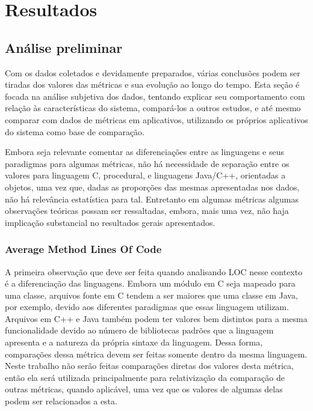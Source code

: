 \chapter{Resultados}
\label{cap:resultados}


\section{Análise preliminar}

Com os dados coletados e devidamente preparados, várias conclusões podem ser tiradas dos valores das métricas e sua evolução ao longo do tempo. Esta seção é focada na análise subjetiva dos dados, tentando explicar seu comportamento com relação às características do sistema, compará-los a outros estudos, e até mesmo comparar com dados de métricas em aplicativos, utilizando os próprios aplicativos do sistema como base de comparação.

Embora seja relevante comentar as diferenciações entre as linguagens e seus paradigmas para algumas métricas,  não há necessidade de separação entre os valores para linguagem C, procedural, e linguagens Java/C++, orientadas a objetos, uma vez que, dadas as proporções das mesmas apresentadas nos dados, não há relevância estatística para tal. Entretanto em algumas métricas algumas observações teóricas possam ser ressaltadas, embora, mais uma vez, não haja implicação substancial no resultados gerais apresentados.

\subsection{Average Method Lines Of Code}
A primeira observação que deve ser feita quando analisando LOC nesse contexto é a diferenciação das linguagens. Embora um módulo em C seja mapeado para uma classe, arquivos fonte em C tendem a ser maiores que uma classe em Java, por exemplo, devido aos diferentes paradigmas que essas linguagem utilizam. Arquivos em C++ e Java também podem ter valores bem distintos para a mesma funcionalidade devido ao número de bibliotecas padrões que a linguagem apresenta e a natureza da própria sintaxe da linguagem. Dessa forma, comparações dessa métrica devem ser feitas somente dentro da mesma linguagem. Neste trabalho não serão feitas comparações diretas dos valores desta métrica, então ela será utilizada principalmente para relativização da comparação de outras métricas, quando aplicável, uma vez que os valores de algumas delas podem ser relacionados a esta. 

